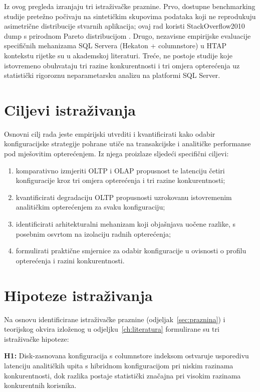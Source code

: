 \label{sec:praznina}
Iz ovog pregleda izranjaju tri istraživačke praznine. Prvo, dostupne benchmarking studije \cite{zhang2024hybench, wu2025htap, zhao2023benchmarking} pretežno počivaju na sintetičkim skupovima podataka koji ne reprodukuju asimetrične distribucije stvarnih aplikacija; ovaj rad koristi StackOverflow2010 dump s prirodnom Pareto distribucijom \cite{zhang2024htap}. Drugo, nezavisne empirijske evaluacije specifičnih mehanizama SQL Servera (Hekaton + columnstore) u HTAP kontekstu rijetke su u akademskoj literaturi. Treće, ne postoje studije koje istovremeno obuhvataju tri razine konkurentnosti i tri omjera opterećenja uz statistički rigoroznu neparametarsku analizu na platformi SQL Server.

\section{Ciljevi istraživanja}
\label{sec:ciljevi}

Osnovni cilj rada jeste empirijski utvrditi i kvantificirati kako odabir konfiguracijske strategije pohrane utiče na transakcijske i analitičke performanse pod mješovitim opterećenjem. Iz njega proizlaze sljedeći specifični ciljevi:
\begin{enumerate}[noitemsep, topsep=2pt]
    \item komparativno izmjeriti OLTP i OLAP propusnost te latenciju četiri konfiguracije kroz tri omjera opterećenja i tri razine konkurentnosti;
    \item kvantificirati degradaciju OLTP propusnosti uzrokovanu istovremenim analitičkim opterećenjem za svaku konfiguraciju;
    \item identificirati arhitekturalni mehanizam koji objašnjava uočene razlike, s posebnim osvrtom na izolaciju radnih opterećenja;
    \item formulirati praktične smjernice za odabir konfiguracije u ovisnosti o profilu opterećenja i razini konkurentnosti.
\end{enumerate}

\section{Hipoteze istraživanja}
\label{sec:hipoteze}

Na osnovu identificirane istraživačke praznine (odjeljak~\ref{sec:praznina}) i teorijskog okvira izloženog u odjeljku~\ref{ch:literatura} formulirane su tri istraživačke hipoteze:

\textbf{H1:} Disk-zasnovana konfiguracija s columnstore indeksom ostvaruje usporedivu latenciju analitičkih upita s hibridnom konfiguracijom pri niskim razinama konkurentnosti, dok razlika postaje statistički značajna pri visokim razinama konkurentnih korisnika.

